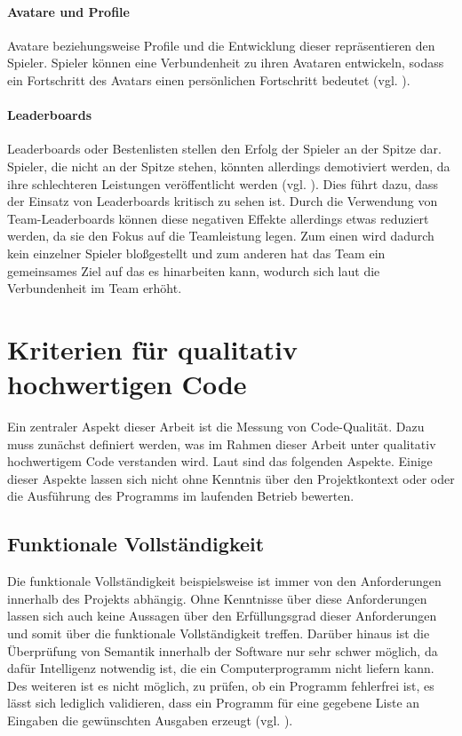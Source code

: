 \documentclass[
	oneside,  %
	ngerman, 
	final, 
	11pt, 
	a4paper, 
	1.1headlines, 
	headinclude=false, 
	footinclude=false, 
	mpinclude=false, 
	pagesize, 
	onecolumn, 
	titlepage, 
	parskip=half, 
	headsepline, 
	chapterprefix=false, 
	version=first, 
	listof=totoc, 
	bibliography=totoc, 
	toc=graduated, 
	fleqn
]{scrbook}
\begin{document}
\paragraph{Avatare und Profile}
Avatare beziehungsweise Profile und die Entwicklung dieser repräsentieren den Spieler.
Spieler können eine Verbundenheit zu ihren Avataren entwickeln, sodass ein Fortschritt des Avatars einen persönlichen Fortschritt bedeutet (vgl. \cite{SH2014}).

\paragraph{Leaderboards}
Leaderboards oder Bestenlisten stellen den Erfolg der Spieler an der Spitze dar.
Spieler, die nicht an der Spitze stehen, könnten allerdings demotiviert werden, da ihre schlechteren Leistungen veröffentlicht werden (vgl. \cite{SH2014}).
Dies führt dazu, dass der Einsatz von Leaderboards kritisch zu sehen ist.
Durch die Verwendung von Team-Leaderboards können diese negativen Effekte allerdings etwas reduziert werden, da sie den Fokus auf die Teamleistung legen.
Zum einen wird dadurch kein einzelner Spieler bloßgestellt und zum anderen hat das Team ein gemeinsames Ziel auf das es hinarbeiten kann, wodurch sich laut \cite{SH2014} die Verbundenheit im Team erhöht. 

\section{Kriterien für qualitativ hochwertigen Code}
\label{Kriterien_guter_Code}
Ein zentraler Aspekt dieser Arbeit ist die Messung von Code-Qualität.
Dazu muss zunächst definiert werden, was im Rahmen dieser Arbeit unter qualitativ hochwertigem Code verstanden wird.
Laut \cite{ISO-25010} sind das folgenden Aspekte.
Einige dieser Aspekte lassen sich nicht ohne Kenntnis über den Projektkontext oder oder die Ausführung des Programms im laufenden Betrieb bewerten.

\subsection{Funktionale Vollständigkeit}
Die funktionale Vollständigkeit beispielsweise ist immer von den Anforderungen innerhalb des Projekts abhängig.
Ohne Kenntnisse über diese Anforderungen lassen sich auch keine Aussagen über den Erfüllungsgrad dieser Anforderungen und somit über die funktionale Vollständigkeit treffen.
Darüber hinaus ist die Überprüfung von Semantik innerhalb der Software nur sehr schwer möglich, da dafür Intelligenz notwendig ist, die ein Computerprogramm nicht liefern kann.
Des weiteren ist es nicht möglich, zu prüfen, ob ein Programm fehlerfrei ist, es lässt sich lediglich validieren, dass ein Programm für eine gegebene Liste an Eingaben die gewünschten Ausgaben erzeugt (vgl. \cite{Di1972}).
\end{document}
